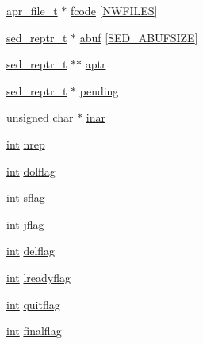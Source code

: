 \begin{DoxyCompactItemize}
\item 
\hyperlink{structapr__file__t}{apr\+\_\+file\+\_\+t} $\ast$ \hyperlink{structsed__eval__s_a100d3ef79eec9d6139585f61bfa92adb}{fcode} \mbox{[}\hyperlink{libsed_8h_ac7f9bc36909bc80839e62e62ac581177}{N\+W\+F\+I\+L\+ES}\mbox{]}
\item 
\hyperlink{libsed_8h_a732387e56354bf438c15e5c9cd085237}{sed\+\_\+reptr\+\_\+t} $\ast$ \hyperlink{structsed__eval__s_a5720afc606d616b64df0e9f23f44c459}{abuf} \mbox{[}\hyperlink{libsed_8h_a58b5504925239ff4179e260ef019602d}{S\+E\+D\+\_\+\+A\+B\+U\+F\+S\+I\+ZE}\mbox{]}
\item 
\hyperlink{libsed_8h_a732387e56354bf438c15e5c9cd085237}{sed\+\_\+reptr\+\_\+t} $\ast$$\ast$ \hyperlink{structsed__eval__s_a7d97d8ced99292b32c7a58b6187c0af7}{aptr}
\item 
\hyperlink{libsed_8h_a732387e56354bf438c15e5c9cd085237}{sed\+\_\+reptr\+\_\+t} $\ast$ \hyperlink{structsed__eval__s_a51d3a6f0b12447d7b50943928f1b8b2b}{pending}
\item 
unsigned char $\ast$ \hyperlink{structsed__eval__s_a45b610268fa1117859a814a8d82cc6ce}{inar}
\item 
\hyperlink{pcre_8txt_a42dfa4ff673c82d8efe7144098fbc198}{int} \hyperlink{structsed__eval__s_a5c03ee23892f5b2d1bce7b0f710815ab}{nrep}
\item 
\hyperlink{pcre_8txt_a42dfa4ff673c82d8efe7144098fbc198}{int} \hyperlink{structsed__eval__s_a4c412b6a80ea7add80745b6d09cf0338}{dolflag}
\item 
\hyperlink{pcre_8txt_a42dfa4ff673c82d8efe7144098fbc198}{int} \hyperlink{structsed__eval__s_ac80ba0bb82ac66a912f1fdaa8735c5a7}{sflag}
\item 
\hyperlink{pcre_8txt_a42dfa4ff673c82d8efe7144098fbc198}{int} \hyperlink{structsed__eval__s_a4be155a1e56df1b6f17eb1068e23c8da}{jflag}
\item 
\hyperlink{pcre_8txt_a42dfa4ff673c82d8efe7144098fbc198}{int} \hyperlink{structsed__eval__s_a6ba7b89aaca75d50bb574d84ff5e7caa}{delflag}
\item 
\hyperlink{pcre_8txt_a42dfa4ff673c82d8efe7144098fbc198}{int} \hyperlink{structsed__eval__s_a5741d3c07dc1863d02f71f55f09aa3f7}{lreadyflag}
\item 
\hyperlink{pcre_8txt_a42dfa4ff673c82d8efe7144098fbc198}{int} \hyperlink{structsed__eval__s_aaf660a3f58ace1338543f57ac5a713c2}{quitflag}
\item 
\hyperlink{pcre_8txt_a42dfa4ff673c82d8efe7144098fbc198}{int} \hyperlink{structsed__eval__s_ab8ed6e233be318dbf63f59601e3f85bf}{finalflag}
\item 
$$
\end{DoxyCompactItemize}

